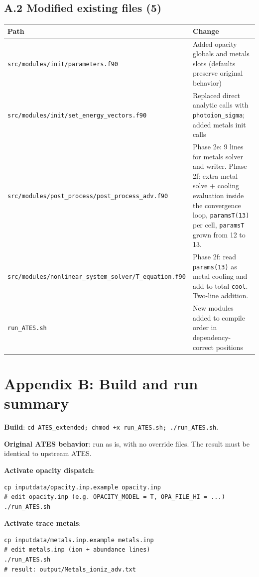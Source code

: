 \documentclass[english,a4paper]{kiseon_memo}
\begin{document}
\subsection*{A.2 Modified existing files (5)}

\begin{center}
\begin{tabular}{|l|p{8cm}|}
\hline
Path & Change \\
\hline
\texttt{src/modules/init/parameters.f90}
   & Added opacity globals and metals slots
     (defaults preserve original behavior) \\
\texttt{src/modules/init/set\_energy\_vectors.f90}
   & Replaced direct analytic calls with \texttt{photoion\_sigma};
     added metals init calls \\
\texttt{src/modules/post\_process/post\_process\_adv.f90}
   & Phase 2e: 9 lines for metals solver and writer.
     Phase 2f: extra metal solve + cooling evaluation inside
     the convergence loop, \texttt{paramsT(13)} per cell,
     \texttt{paramsT} grown from 12 to 13. \\
\texttt{src/modules/nonlinear\_system\_solver/T\_equation.f90}
   & Phase 2f: read \texttt{params(13)} as metal cooling and add to
     total \texttt{cool}. Two-line addition. \\
\texttt{run\_ATES.sh}
   & New modules added to compile order in dependency-correct positions \\
\hline
\end{tabular}
\end{center}

\section*{Appendix B: Build and run summary}

\textbf{Build}:
\texttt{cd ATES\_extended; chmod +x run\_ATES.sh; ./run\_ATES.sh}.

\textbf{Original ATES behavior}: run as is, with no override files. The
result must be identical to upstream ATES.

\textbf{Activate opacity dispatch}:
\begin{verbatim}
cp inputdata/opacity.inp.example opacity.inp
# edit opacity.inp (e.g. OPACITY_MODEL = T, OPA_FILE_HI = ...)
./run_ATES.sh
\end{verbatim}

\textbf{Activate trace metals}:
\begin{verbatim}
cp inputdata/metals.inp.example metals.inp
# edit metals.inp (ion + abundance lines)
./run_ATES.sh
# result: output/Metals_ioniz_adv.txt
\end{verbatim}
\end{document}
